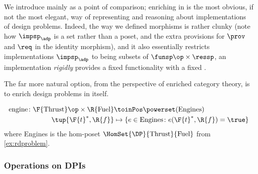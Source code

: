 {We introduce \DPI mainly as a point of comparison; enriching in \Set is the most obvious, if not the most elegant, way of representing and reasoning about implementations of design problems. Indeed, the way we defined morphisms is rather clunky (note how $\impsp_\adp$ is a set rather than a poset, and the extra provisions for $\prov$ and $\req$ in the identity morphism), and it also essentially restricts implementations $\impsp_\adp$ to being subsets of $\funsp\op \times \ressp$, \ie  an implementation \emph{rigidly} provides a fixed functionality \fun with a fixed \res.

The far more natural option, from the perspective of enriched category theory, is to enrich design problems in \DP itself.

\begin{example}
  \begin{equation}
    \begin{aligned}
      \text{engine} \colon \F{\text{Thrust}}\op \times \R{\text{Fuel}} &\toinPos \powerset(\text{Engines}) \\
      \tup{\F{t}^*,\R{f}} &\mapsto \{ e \in \text{Engines} \colon e(\F{t}^*, \R{f}) = \true \}
    \end{aligned}
  \end{equation}
  where Engines is the hom-poset $\HomSet{\DP}{\text{Thrust}}{\text{Fuel}}$ from \cref{ex:rdproblem}.
\end{example}

\subsubsection{Operations on DPIs}
}



